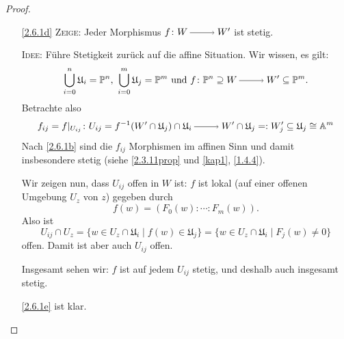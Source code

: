 \documentclass[a4paper,12pt,index=toc]{scrbook}
\theoremstyle{keinenummern} %
\def\A{\mathbb{A}}
\def\P{\mathbb{P}}
\def\U{\mathfrak{U}}
\newcommand{\restrict}[1]{|_{#1}}
\begin{document}
\begin{proof}
\begin{enumerate}
  \item[\ref{2.6.1d}] {\scshape Zeige:} Jeder Morphismus $f\colon W\ra W'$ ist stetig.

 {\scshape Idee:} Führe Stetigkeit zurück auf die affine Situation.
Wir wissen, es gilt:
\begin{equation*}\bigcup_{i=0}^{n}\U_i=\P^n,\ \bigcup_{i=0}^{m}\U_j=\P^m\text{ und } f\colon \P^n \supseteq W\ra W'\subseteq \P^m.\end{equation*}
Betrachte also
\begin{equation*} f_{ij}=f\restrict{U_{ij}} \colon U_{ij}=f^{-1}(W'\cap \U_j)\cap\U_{i}\ra W'\cap \U_j=:W_j'\subseteq \U_j\cong \A^m\end{equation*}
Nach \ref{2.6.1b} sind die $f_{ij}$ Morphismen im affinen Sinn und damit insbesondere stetig (siehe \cref{2.3.11prop} und \cref{kap1}, \cref{1.4.4}).

Wir zeigen nun, dass $U_{ij}$ offen in $W$ ist: $f$ ist lokal (auf einer offenen Umgebung $U_z$ von $z$) gegeben durch 
\begin{equation*}f(w)=(F_0(w):\dotsm :F_m(w)).\end{equation*}
Also ist 
\begin{equation*}U_{ij}\cap U_z=\{w \in U_z\cap \U_i \mid f(w) \in \U_j\}=\{w \in U_z\cap \U_i \mid F_j(w)\neq 0\}\end{equation*}
offen. Damit ist aber auch $U_{ij}$ offen.

Insgesamt sehen wir: $f$ ist auf jedem $U_{ij}$ stetig, und deshalb auch insgesamt stetig.
  \item[\ref{2.6.1e}] ist klar.
  \end{enumerate}  
\end{proof}
\end{document}
